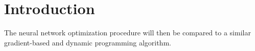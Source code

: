 \section{Introduction}
The neural network optimization procedure will then be compared to a similar gradient-based and dynamic programming algorithm.